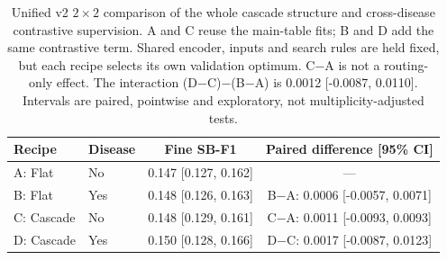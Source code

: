 \begin{table}[t]
\centering\small
\setlength{\tabcolsep}{4pt}
\begin{tabular}{llcc}
\toprule
Recipe & Disease & Fine SB-F1 & Paired difference [95\% CI] \\
\midrule
A: Flat & No & 0.147 [0.127, 0.162] & --- \\
B: Flat & Yes & 0.148 [0.126, 0.163] & B$-$A: 0.0006 [-0.0057, 0.0071] \\
C: Cascade & No & 0.148 [0.129, 0.161] & C$-$A: 0.0011 [-0.0093, 0.0093] \\
D: Cascade & Yes & 0.150 [0.128, 0.166] & D$-$C: 0.0017 [-0.0087, 0.0123] \\
\bottomrule
\end{tabular}
\caption{Unified v2 $2\times2$ comparison of the whole cascade structure and cross-disease contrastive supervision. A and C reuse the main-table fits; B and D add the same contrastive term. Shared encoder, inputs and search rules are held fixed, but each recipe selects its own validation optimum. C$-$A is not a routing-only effect. The interaction (D$-$C)$-$(B$-$A) is 0.0012 [-0.0087, 0.0110]. Intervals are paired, pointwise and exploratory, not multiplicity-adjusted tests.}
\label{tab:unified_ablation}
\end{table}
